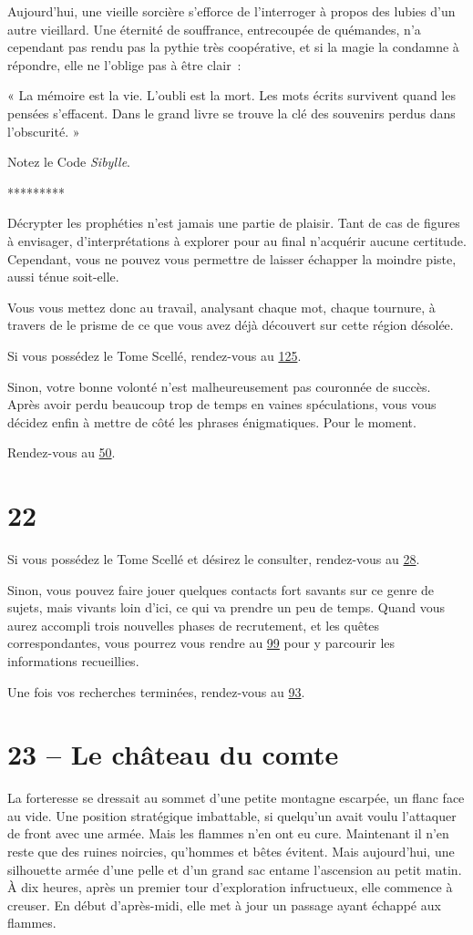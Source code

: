 \documentclass{report}
\newcommand{\gsection}[1]{
    \section{#1}
    \label{section-#1}
}
\newcommand{\glink}[1]{\hyperref[section-#1]{#1}}
\newcommand{\ellipse}{
    \begin{center}
        *********
    \end{center}
}
\begin{document}
Aujourd'hui, une vieille sorcière s'efforce de l'interroger à propos des lubies d'un autre vieillard. Une éternité de souffrance, entrecoupée de quémandes, n'a cependant pas rendu pas la pythie très coopérative, et si la magie la condamne à répondre, elle ne l'oblige pas à être clair :

« La mémoire est la vie. L'oubli est la mort. Les mots écrits survivent quand les pensées s'effacent. Dans le grand livre se trouve la clé des souvenirs perdus dans l'obscurité. »

Notez le Code \emph{Sibylle}.

\ellipse

Décrypter les prophéties n'est jamais une partie de plaisir. Tant de cas de figures à envisager, d'interprétations à explorer pour au final n'acquérir aucune certitude. Cependant, vous ne pouvez vous permettre de laisser échapper la moindre piste, aussi ténue soit-elle.

Vous vous mettez donc au travail, analysant chaque mot, chaque tournure, à travers de le prisme de ce que vous avez déjà découvert sur cette région désolée.

Si vous possédez le Tome Scellé, rendez-vous au \glink{125}.

Sinon, votre bonne volonté n'est malheureusement pas couronnée de succès. Après avoir perdu beaucoup trop de temps en vaines spéculations, vous vous décidez enfin à mettre de côté les phrases énigmatiques. Pour le moment.

Rendez-vous au \glink{50}.

\gsection{22}

Si vous possédez le Tome Scellé et désirez le consulter, rendez-vous au \glink{28}.

Sinon, vous pouvez faire jouer quelques contacts fort savants sur ce genre de sujets, mais vivants loin d'ici, ce qui va prendre un peu de temps. Quand vous aurez accompli trois nouvelles phases de recrutement, et les quêtes correspondantes, vous pourrez vous rendre au \glink{99} pour y parcourir les informations recueillies.

Une fois vos recherches terminées, rendez-vous au \glink{93}.

\gsection{23 – Le château du comte}

La forteresse se dressait au sommet d'une petite montagne escarpée, un flanc face au vide. Une position stratégique imbattable, si quelqu'un avait voulu l'attaquer de front avec une armée. Mais les flammes n'en ont eu cure. Maintenant il n'en reste que des ruines noircies, qu'hommes et bêtes évitent. Mais aujourd'hui, une silhouette armée d'une pelle et d'un grand sac entame l'ascension au petit matin. À dix heures, après un premier tour d'exploration infructueux, elle commence à creuser. En début d'après-midi, elle met à jour un passage ayant échappé aux flammes.
\end{document}
